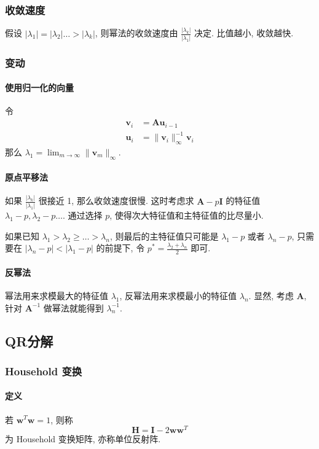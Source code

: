 \documentclass{ctexart}
\begin{document}
\subsubsection{收敛速度}
    假设 $|\lambda_1| = |\lambda_2| \ldots > |\lambda_k|$, 则幂法的收敛速度由 $\frac{|\lambda_k|}{|\lambda_1|}$ 决定.
    比值越小, 收敛越快.
\subsubsection{变动}
\paragraph{使用归一化的向量}
    令\begin{align*}
        \mathbf{v}_i &= \mathbf{A} \mathbf{u}_{i-1}\\
        \mathbf{u}_i &= \|\mathbf{v}_i\|_{\infty}^{-1} \mathbf{v}_i
    \end{align*}
    那么 $\lambda_1 = \lim_{m\to\infty} \| \mathbf{v}_m \|_{\infty}$.
\paragraph{原点平移法}
    如果 $\frac{|\lambda_k|}{|\lambda_1|}$ 很接近 1, 那么收敛速度很慢.
    这时考虑求 $\mathbf{A} - p \mathbf{I} $ 的特征值 $\lambda_1 - p, \lambda_2 - p \ldots$.
    通过选择 $p$, 使得次大特征值和主特征值的比尽量小.\par
    如果已知 $\lambda_1 > \lambda_2 \ge \ldots > \lambda_n$,
    则最后的主特征值只可能是 $\lambda_1 -p$ 或者 $\lambda_n - p$, 只需要在
    $|\lambda_n - p| < |\lambda_1 - p|$ 的前提下, 令 $p^* = \frac{\lambda_2 + \lambda_n}{2}$ 即可.
\paragraph{反幂法}
    幂法用来求模最大的特征值 $\lambda_1$, 反幂法用来求模最小的特征值 $\lambda_n$.
    显然, 考虑 $\mathbf{A}$, 针对 $ \mathbf{A}^{-1}$ 做幂法就能得到 $\lambda_n^{-1}$.\par

\subsection{QR分解}
\subsubsection{Household 变换}
\paragraph{定义}
    若 $ \mathbf{w}^T \mathbf{w} = 1$, 则称 \[
        \mathbf{H} = \mathbf{I} - 2 \mathbf{w} \mathbf{w}^T\]
    为 Household 变换矩阵, 亦称单位反射阵.
\end{document}
